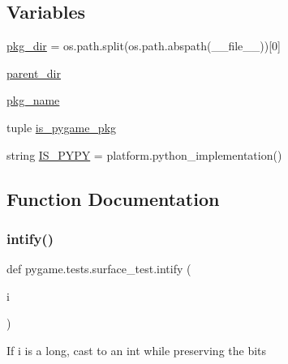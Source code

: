 \subsection*{Variables}
\begin{DoxyCompactItemize}
\item 
\hyperlink{namespacepygame_1_1tests_1_1surface__test_a539c0556cb15b8b7e4fc29e94c23aa26}{pkg\+\_\+dir} = os.\+path.\+split(os.\+path.\+abspath(\+\_\+\+\_\+file\+\_\+\+\_\+))\mbox{[}0\mbox{]}
\item 
\hyperlink{namespacepygame_1_1tests_1_1surface__test_a109496474e4477b558098df76db065ee}{parent\+\_\+dir}
\item 
\hyperlink{namespacepygame_1_1tests_1_1surface__test_ab16a2891cd45158868f3a1fb1cd693f1}{pkg\+\_\+name}
\item 
tuple \hyperlink{namespacepygame_1_1tests_1_1surface__test_a3b5650e7af31fe50e189b88bcbba0f20}{is\+\_\+pygame\+\_\+pkg}
\item 
string \hyperlink{namespacepygame_1_1tests_1_1surface__test_ad25cbadf98ecc8ff12e29881787edd98}{I\+S\+\_\+\+P\+Y\+PY} = platform.\+python\+\_\+implementation()
\end{DoxyCompactItemize}


\subsection{Function Documentation}
\mbox{\label{namespacepygame_1_1tests_1_1surface__test_a7c68e5fb86ee15fdeb5efc7dc6184db0}} 
\subsubsection{\texorpdfstring{intify()}{intify()}}
{\footnotesize\ttfamily def pygame.\+tests.\+surface\+\_\+test.\+intify (\begin{DoxyParamCaption}\item[{}]{i }\end{DoxyParamCaption})}

\begin{DoxyVerb}If i is a long, cast to an int while preserving the bits\end{DoxyVerb}
 \mbox{\label{namespacepygame_1_1tests_1_1surface__test_a1c8d5e704ef5593788e3abbd091f92b2}} 
